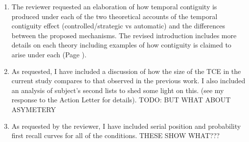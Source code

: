 \documentclass[12pt]{article}
\begin{document}
\begin{enumerate}

\item 
	The reviewer requested an elaboration of how temporal contiguity is produced under each of the two theoretical accounts of the temporal contiguity effect (controlled/strategic vs automatic) and the differences between the proposed mechanisms. The revised introduction includes more details on each theory including examples of how contiguity is claimed to arise under each (Page \pageref{TODO-2}). 

\item
	As requested, I have included a discussion of how the size of the TCE in the current study compares to that observed in the previous work. I also included an analysis of subject's second lists to shed some light on this. (see my response to the Action Letter for details). TODO: BUT WHAT ABOUT ASYMETERY

	
\item
	As requested by the reviewer, I have included serial position and probability first recall curves for all of the conditions. THESE SHOW WHAT??? \pageref{TODO-7}



\end{enumerate}
\end{document}
